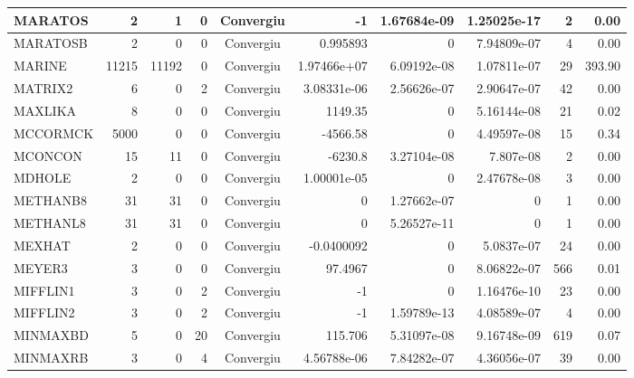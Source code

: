 \begin{center}
\begin{longtable}{|l|r|r|r|c|r|r|r|r|r|}
 MARATOS &      2 &      1 &      0 & Convergiu  &          -1 &    1.67684e-09 & 1.25025e-17 &      2 &    0.00 \\ \hline
MARATOSB &      2 &      0 &      0 & Convergiu  &    0.995893 &              0 & 7.94809e-07 &      4 &    0.00 \\ \hline
  MARINE &  11215 &  11192 &      0 & Convergiu  & 1.97466e+07 &    6.09192e-08 & 1.07811e-07 &     29 &  393.90 \\ \hline
 MATRIX2 &      6 &      0 &      2 & Convergiu  & 3.08331e-06 &    2.56626e-07 & 2.90647e-07 &     42 &    0.00 \\ \hline
 MAXLIKA &      8 &      0 &      0 & Convergiu  &     1149.35 &              0 & 5.16144e-08 &     21 &    0.02 \\ \hline
MCCORMCK &   5000 &      0 &      0 & Convergiu  &    -4566.58 &              0 & 4.49597e-08 &     15 &    0.34 \\ \hline
 MCONCON &     15 &     11 &      0 & Convergiu  &     -6230.8 &    3.27104e-08 &   7.807e-08 &      2 &    0.00 \\ \hline
  MDHOLE &      2 &      0 &      0 & Convergiu  & 1.00001e-05 &              0 & 2.47678e-08 &      3 &    0.00 \\ \hline
METHANB8 &     31 &     31 &      0 & Convergiu  &           0 &    1.27662e-07 &           0 &      1 &    0.00 \\ \hline
METHANL8 &     31 &     31 &      0 & Convergiu  &           0 &    5.26527e-11 &           0 &      1 &    0.00 \\ \hline
  MEXHAT &      2 &      0 &      0 & Convergiu  &  -0.0400092 &              0 &  5.0837e-07 &     24 &    0.00 \\ \hline
  MEYER3 &      3 &      0 &      0 & Convergiu  &     97.4967 &              0 & 8.06822e-07 &    566 &    0.01 \\ \hline
MIFFLIN1 &      3 &      0 &      2 & Convergiu  &          -1 &              0 & 1.16476e-10 &     23 &    0.00 \\ \hline
MIFFLIN2 &      3 &      0 &      2 & Convergiu  &          -1 &    1.59789e-13 & 4.08589e-07 &      4 &    0.00 \\ \hline
MINMAXBD &      5 &      0 &     20 & Convergiu  &     115.706 &    5.31097e-08 & 9.16748e-09 &    619 &    0.07 \\ \hline
MINMAXRB &      3 &      0 &      4 & Convergiu  & 4.56788e-06 &    7.84282e-07 & 4.36056e-07 &     39 &    0.00 \\ \hline

\end{longtable}
\end{center}
